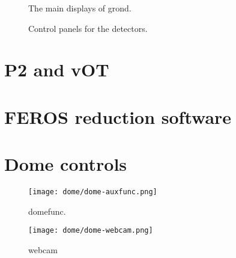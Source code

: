 \documentclass[11pt,fleqn,a4paper]{book}
\begin{document}
\begin{figure}[!ht]
\centering
{}\hfill
{}
\caption[The main displays of GROND]{The main displays of \gls{grond}.}
\label{fig:grondmain}
\end{figure}

\begin{figure}[!ht]
\centering
{}\hfill
{}
\caption{Control panels for the detectors.}
\label{fig:gronddet}
\end{figure}



\section{P2 and vOT}

\section{FEROS reduction software}

\section{Dome controls}
\begin{figure}[!ht]
\centering
\texttt{[image: dome/dome-auxfunc.png]}
\caption[Dome auxiliary functions]{\gls{domefunc}.}
\label{fig:domefunc}
\end{figure}

\begin{figure}[!ht]
\centering
  \texttt{[image: dome/dome-webcam.png]}%
\caption[Dome webcam]{\gls{webcam}}
\label{fig:webcam}
\end{figure}
\end{document}
